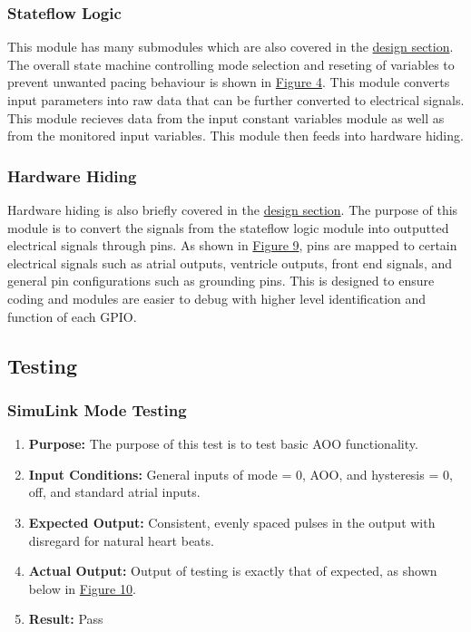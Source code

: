 \documentclass{article}
\newcounter{subsubsubsection}[subsubsection]
\begin{document}
\subsubsection{Stateflow Logic}
This module has many submodules which are also covered in the \hyperref[dessec]{design section}. The overall state machine controlling 
mode selection and reseting of variables to prevent unwanted pacing behaviour is shown in \hyperref[StateMod]{Figure 4}. This module 
converts input parameters into raw data that can be further converted to electrical signals. This module recieves data 
from the input constant variables module as well as from the monitored input variables. This module then feeds into 
hardware hiding. 

\subsubsection{Hardware Hiding}
Hardware hiding is also briefly covered in the \hyperref[dessec]{design section}. The purpose of this module is 
to convert the signals from the stateflow logic module into outputted electrical signals through pins. As shown in 
\hyperref[HardHide]{Figure 9}, pins are mapped to certain electrical signals such as atrial outputs, ventricle outputs, 
front end signals, and general pin configurations such as grounding pins. This is designed to ensure coding and modules 
are easier to debug with higher level identification and function of each GPIO. 

\newpage
\subsection{Testing}

\subsubsection{SimuLink Mode Testing}


\begin{enumerate}[label=]
   \item \textbf{Purpose:} The purpose of this test is to test basic AOO functionality.
   \item \textbf{Input Conditions:} General inputs of mode = 0, AOO, and hysteresis = 0, off, and standard 
   atrial inputs. 
   \item \textbf{Expected Output:} Consistent, evenly spaced pulses in the output with disregard for natural heart beats.
   \item \textbf{Actual Output:} Output of testing is exactly that of expected, as shown below in \hyperref[AOOtest]{Figure 10}.
   \item \textbf{Result:} Pass
\end{enumerate}
\end{document}
